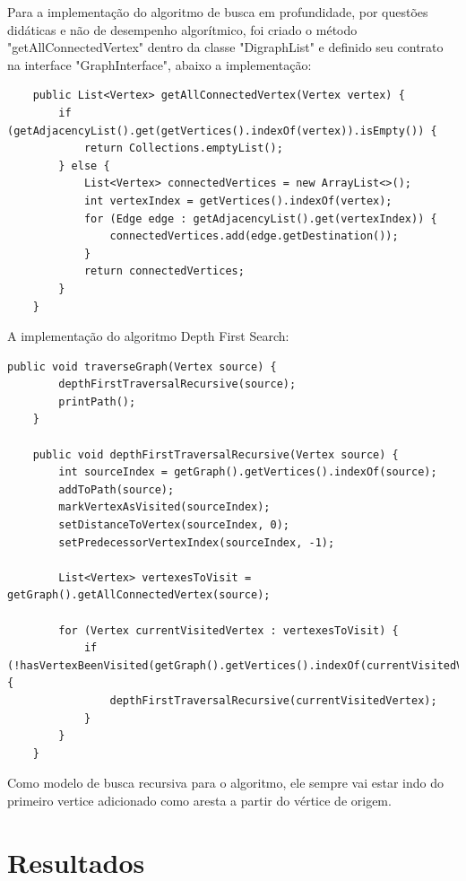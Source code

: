 \documentclass[a4paper, 12pt]{article}
\begin{document}
Para a implementação do algoritmo de busca em profundidade, por questões didáticas e não de desempenho algorítmico, foi criado o método "getAllConnectedVertex" dentro da classe "DigraphList" e definido seu contrato na interface "GraphInterface", abaixo a implementação:

\begin{verbatim}
    public List<Vertex> getAllConnectedVertex(Vertex vertex) {
        if (getAdjacencyList().get(getVertices().indexOf(vertex)).isEmpty()) {
            return Collections.emptyList();
        } else {
            List<Vertex> connectedVertices = new ArrayList<>();
            int vertexIndex = getVertices().indexOf(vertex);
            for (Edge edge : getAdjacencyList().get(vertexIndex)) {
                connectedVertices.add(edge.getDestination());
            }
            return connectedVertices;
        }
    }
\end{verbatim}

A implementação do algoritmo Depth First Search: 

\begin{verbatim}
public void traverseGraph(Vertex source) {
        depthFirstTraversalRecursive(source);
        printPath();
    }

    public void depthFirstTraversalRecursive(Vertex source) {
        int sourceIndex = getGraph().getVertices().indexOf(source);
        addToPath(source);
        markVertexAsVisited(sourceIndex);
        setDistanceToVertex(sourceIndex, 0);
        setPredecessorVertexIndex(sourceIndex, -1);

        List<Vertex> vertexesToVisit = getGraph().getAllConnectedVertex(source);

        for (Vertex currentVisitedVertex : vertexesToVisit) {
            if (!hasVertexBeenVisited(getGraph().getVertices().indexOf(currentVisitedVertex))) {
                depthFirstTraversalRecursive(currentVisitedVertex);
            }
        }
    }
\end{verbatim}

Como modelo de busca recursiva para o algoritmo, ele sempre vai estar indo do primeiro vertice adicionado como aresta a partir do vértice de origem.

\newpage
\section{Resultados}
\graphicspath{ {./Results/} }
\end{document}
